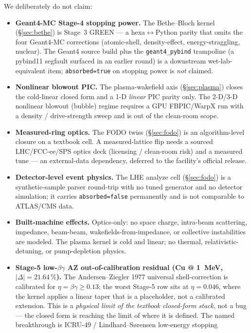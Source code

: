 \documentclass[11pt,a4paper]{article}
\begin{document}
We deliberately do not claim:
\begin{itemize}\itemsep0.2em
\item \textbf{Geant4-MC Stage-4 stopping power.} The Bethe--Bloch kernel
  (\S\ref{sec:bethe}) is Stage~3 GREEN --- a hexa$\leftrightarrow$Python
  parity that omits the four Geant4-MC corrections (atomic-shell,
  density-effect, energy-straggling, nuclear). The Geant4 source build
  plus the \texttt{geant4\_pybind} trampoline (a pybind11 segfault
  surfaced in an earlier round) is a downstream wet-lab-equivalent item;
  \texttt{absorbed=true} on stopping power is \emph{not} claimed.
\item \textbf{Nonlinear blowout PIC.} The plasma-wakefield axis
  (\S\ref{sec:plasma}) closes the cold-linear closed form and a 1-D
  \emph{linear} PIC parity only. The 2-D/3-D nonlinear blowout (bubble)
  regime requires a GPU FBPIC/WarpX run with a density / drive-strength
  sweep and is out of the clean-room scope.
\item \textbf{Measured-ring optics.} The FODO twiss (\S\ref{sec:fodo}) is
  an algorithm-level closure on a textbook cell. A measured-lattice flip
  needs a sourced LHC/FCC-ee/SPS optics deck (licensing / clean-room
  risk) and a measured tune --- an external-data dependency, deferred to
  the facility's official release.
\item \textbf{Detector-level event physics.} The LHE analyze cell
  (\S\ref{sec:fodo}) is a synthetic-sample parser round-trip with no
  tuned generator and no detector simulation; it carries
  \texttt{absorbed=false} permanently and is not comparable to
  ATLAS/CMS data.
\item \textbf{Built-machine effects.} Optics-only: no space charge,
  intra-beam scattering, impedance, beam-beam, wakefields-from-impedance,
  or collective instabilities are modeled. The plasma kernel is cold and
  linear; no thermal, relativistic-detuning, or pump-depletion physics.
\item \textbf{Stage-5 low-$\beta\gamma$ AZ out-of-calibration residual
  (Cu @ \SI{1}{MeV}, $|\Delta|\!=\!21.64\,\%$).} The Andersen--Ziegler
  1977 universal shell-correction is calibrated for
  $\eta\!=\!\beta\gamma\!\ge\!0.13$; the worst Stage-5 row sits at
  $\eta\!=\!0.046$, where the kernel applies a linear taper that is a
  placeholder, not a calibrated extension. This is a \emph{physical
  limit of the textbook closed-form stack}, not a bug --- the closed
  form is reaching the limit of where it is defined. The named
  breakthrough is ICRU-49 / Lindhard--Sørensen low-energy stopping

\end{itemize}
\end{document}
